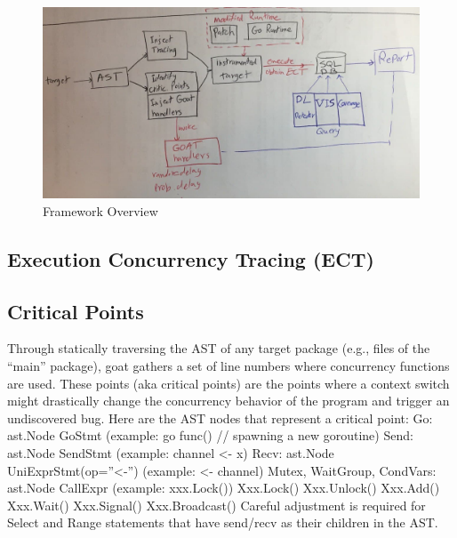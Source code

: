 \begin{figure}
\centering
  \includegraphics[width=.95\linewidth]{figs/overview-hand.jpg}
  \caption{Framework Overview}
  \label{fig:overview}
\end{figure}


\subsection{Execution Concurrency Tracing (ECT)}
\label{sec:ect}



\subsection{Critical Points}
\label{sec:critical}

Through statically traversing the AST of any target package (e.g., files of the “main” package), goat gathers a set of line numbers where concurrency functions are used. These points (aka critical points) are the points where a context switch might drastically change the concurrency behavior of the program and trigger an undiscovered bug. Here are the AST nodes that represent a critical point:
Go: ast.Node GoStmt   (example: go func() // spawning a new goroutine)
Send: ast.Node SendStmt     (example: channel <- x)
Recv: ast.Node UniExprStmt(op=”<-”) (example:  <- channel)
Mutex, WaitGroup, CondVars: ast.Node CallExpr (example: xxx.Lock())
Xxx.Lock()
Xxx.Unlock()
Xxx.Add()
Xxx.Wait()
Xxx.Signal()
Xxx.Broadcast()
Careful adjustment is required for Select and Range statements that have send/recv as their children in the AST.


